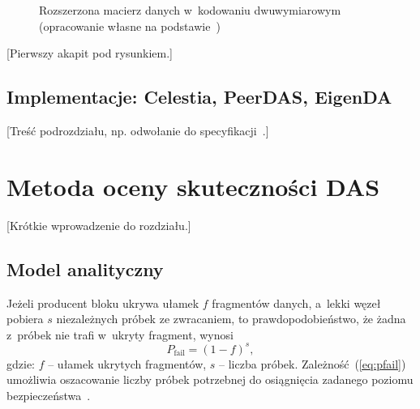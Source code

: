 \documentclass[a4paper,12pt,twoside,openany]{report}
\begin{document}
\begin{figure}[htbp]
  \caption{Rozszerzona macierz danych w~kodowaniu dwuwymiarowym (opracowanie własne na podstawie~\cite{AlBassam2018Fraud})}
  \label{fig:kwadrat}
\end{figure}

[Pierwszy akapit pod rysunkiem.]

\section{Implementacje: Celestia, PeerDAS, EigenDA}

 [Treść podrozdziału, np. odwołanie do specyfikacji~\cite{EIP7594}.]

\chapter{Metoda oceny skuteczności DAS}
\label{chap:metoda}

[Krótkie wprowadzenie do rozdziału.]

\section{Model analityczny}

Jeżeli producent bloku ukrywa ułamek $f$ fragmentów danych, a~lekki węzeł
pobiera $s$ niezależnych próbek ze zwracaniem, to prawdopodobieństwo, że
żadna z~próbek nie trafi w~ukryty fragment, wynosi
\begin{equation}
  P_{\mathrm{fail}} = (1 - f)^{s},
  \label{eq:pfail}
\end{equation}
gdzie: $f$ -- ułamek ukrytych fragmentów, $s$ -- liczba próbek.
Zależność~(\ref{eq:pfail}) umożliwia oszacowanie liczby próbek potrzebnej do
osiągnięcia zadanego poziomu bezpieczeństwa~\cite{Mitzenmacher2017}.
\end{document}
